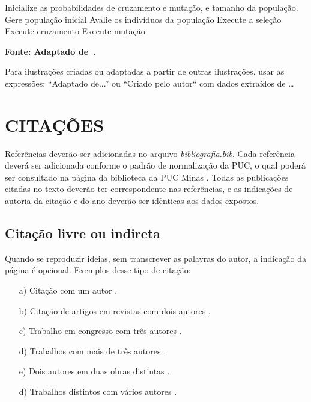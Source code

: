 \begin{algoritmo}
	\footnotesize
	\label{alg:ag}
    \begin{algorithmic}[1]
    		\State Inicialize as probabilidades de cruzamento e mutação, e tamanho da população.
		\State Gere população inicial
			\State Avalie os indivíduos da população
			\State Execute a seleção
			\State Execute cruzamento
			\State Execute mutação
		\EndWhile{}
  	\end{algorithmic}
	\textbf{\small{Fonte: Adaptado de~.}}
\end{algoritmo}

Para ilustrações criadas ou adaptadas a partir de outras ilustrações, usar as expressões: 
“Adaptado de...” ou “Criado pelo autor`` com dados extraídos de \ldots
   
   
\chapter{ CITAÇÕES}


Referências deverão ser adicionadas no arquivo \textit{bibliografia.bib}. Cada referência deverá ser adicionada conforme o padrão de normalização da PUC, 
o qual poderá ser consultado na página da biblioteca da PUC Minas \cite{manualpuc}. Todas as publicações citadas no texto deverão ter correspondente nas referências, 
e as indicações de autoria da citação e do ano deverão ser idênticas aos dados expostos.


\section{\esp Citação livre ou indireta}

Quando se reproduzir ideias, sem transcrever as palavras do autor, a indicação da página é opcional. Exemplos desse tipo de citação:
\begin{enumerate} 
 \item [a)] Citação com um autor \cite{knuth}. 
 \item [b)] Citação de artigos em revistas com dois autores \cite{artigo01}.
  \item [c)] Trabalho em congresso com três autores \cite{dovzan:01}.
 \item [d)] Trabalhos com mais de três autores \cite{cap-livro}.
 \item [e)] Dois autores em duas obras distintas \cite{knuth,groupp}.
 \item [d)] Trabalhos distintos com vários autores \cite{congresso,cap-livro}.
 
\end{enumerate}

